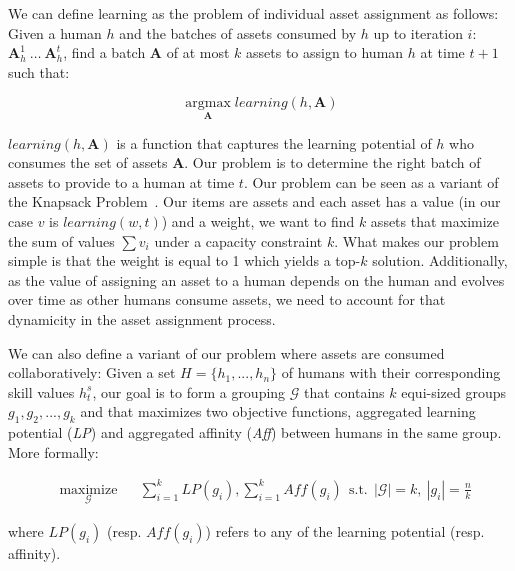 \documentclass[11pt]{article}
\begin{document}
We can define learning as the problem of individual asset assignment as follows:
Given a human $h$ and the batches of assets consumed by $h$ up to iteration $i$: $\mathbf{A}_h^1 \ \ldots \ \mathbf{A}_h^t$, find a batch $\mathbf{A}$ of at most $k$ assets to assign to human $h$ at time $t+1$ such that:

\[ \operatorname*{argmax}_{\mathbf{A}} \mathit{learning}(h,\mathbf{A}) \]

$\mathit{learning}(h,\mathbf{A})$ is a function that captures the learning potential of $h$ who consumes the set of assets $\mathbf{A}$. Our problem is to determine the right batch of assets to provide to a human at time $t$. 
Our problem can be seen as a variant of the Knapsack Problem~\cite{Chekuri06apolynomial}. Our items are assets and each asset has a value (in our case $v$ is $\mathit{learning(w,t)}$) and a weight, we want to find $k$ assets that maximize the sum of values $\sum v_i$ under a capacity constraint $k$. What makes our problem simple is that the weight is equal to 1 which yields a top-$k$ solution. Additionally, as the value of assigning an asset to a human depends on the human and evolves over time as other humans consume assets, we need to account for that dynamicity in the asset assignment process. 

We can also define a variant of our problem where assets are consumed collaboratively:
Given a set $H=\{h_1,...,h_n\}$ of humans with their corresponding skill values $h_t^s$, our goal is to form a grouping $\mathcal{G}$ that contains $k$ equi-sized groups $g_1,g_2,...,g_k$ and that maximizes two objective functions, aggregated learning potential ({\em LP}) and aggregated affinity ({\em Aff}) between humans in the same group. More formally:

\begin{equation}
\begin{aligned}
& \underset{\mathcal{G}}{\text{maximize}}
& & \sum_{i=1}^{k}\mathit{LP}(g_i), \sum_{i=1}^{k}\mathit{Aff}(g_i)
\ \ \text{s.t.} \ \ |\mathcal{G}| = k, \ |g_i| = \frac{n}{k}
\end{aligned}
\label{multiobjective-proA}
\end{equation}

where $\mathit{LP}(g_i)$ (resp. $\mathit{Aff}(g_i)$) refers to any of the learning potential (resp. affinity). \\
\end{document}
